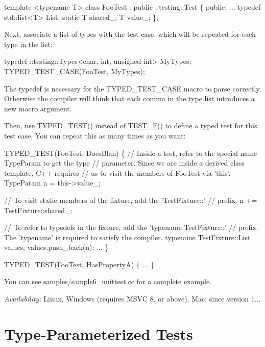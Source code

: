 \begin{DoxyCode}
template <typename T>
class FooTest : public ::testing::Test \{
 public:
  ...
  typedef std::list<T> List;
  static T shared\_;
  T value\_;
\};
\end{DoxyCode}


Next, associate a list of types with the test case, which will be repeated for each type in the list\+:


\begin{DoxyCode}
typedef ::testing::Types<char, int, unsigned int> MyTypes;
TYPED\_TEST\_CASE(FooTest, MyTypes);
\end{DoxyCode}


The {\ttfamily typedef} is necessary for the {\ttfamily T\+Y\+P\+E\+D\+\_\+\+T\+E\+S\+T\+\_\+\+C\+A\+SE} macro to parse correctly. Otherwise the compiler will think that each comma in the type list introduces a new macro argument.

Then, use {\ttfamily T\+Y\+P\+E\+D\+\_\+\+T\+E\+S\+T()} instead of {\ttfamily \hyperlink{test__tracker_8cpp_a567724948cdce4788a1e8c8baf6b6cfe}{T\+E\+S\+T\+\_\+\+F()}} to define a typed test for this test case. You can repeat this as many times as you want\+:


\begin{DoxyCode}
TYPED\_TEST(FooTest, DoesBlah) \{
  // Inside a test, refer to the special name TypeParam to get the type
  // parameter.  Since we are inside a derived class template, C++ requires
  // us to visit the members of FooTest via 'this'.
  TypeParam n = this->value\_;

  // To visit static members of the fixture, add the 'TestFixture::'
  // prefix.
  n += TestFixture::shared\_;

  // To refer to typedefs in the fixture, add the 'typename TestFixture::'
  // prefix.  The 'typename' is required to satisfy the compiler.
  typename TestFixture::List values;
  values.push\_back(n);
  ...
\}

TYPED\_TEST(FooTest, HasPropertyA) \{ ... \}
\end{DoxyCode}


You can see {\ttfamily samples/sample6\+\_\+unittest.\+cc} for a complete example.

{\itshape Availability\+:} Linux, Windows (requires M\+S\+VC 8. or above), Mac; since version 1...

\section*{Type-\/\+Parameterized Tests}

